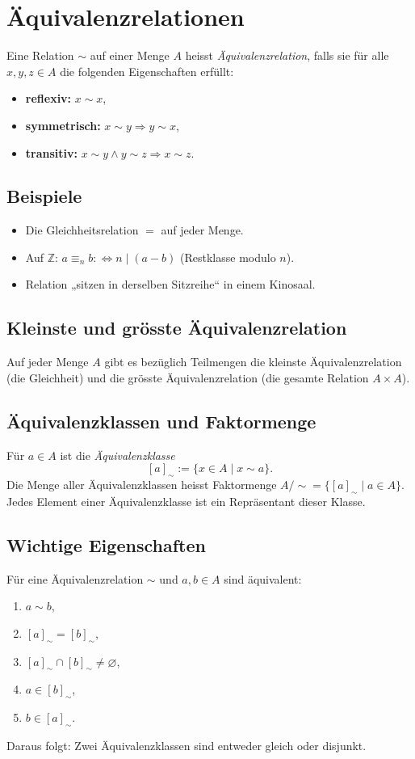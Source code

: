 \section{Äquivalenzrelationen}
Eine Relation $\sim$ auf einer Menge $A$ heisst \emph{Äquivalenzrelation}, falls sie für alle $x,y,z\in A$ die folgenden Eigenschaften erfüllt:
\begin{itemize}
  \item \textbf{reflexiv:} \quad $x\sim x$,
  \item \textbf{symmetrisch:} \quad $x\sim y \Rightarrow y\sim x$,
  \item \textbf{transitiv:} \quad $x\sim y \land y\sim z \Rightarrow x\sim z$.
\end{itemize}

\subsection{Beispiele}
\begin{itemize}
  \item Die Gleichheitsrelation $=$ auf jeder Menge.
  \item Auf $\mathbb{Z}$: $a\equiv_n b :\Leftrightarrow n\mid(a-b)$ (Restklasse modulo $n$).
  \item Relation „sitzen in derselben Sitzreihe“ in einem Kinosaal.
\end{itemize}

\subsection{Kleinste und gr\"osste Äquivalenzrelation}
Auf jeder Menge $A$ gibt es bezüglich Teilmengen die kleinste Äquivalenzrelation (die Gleichheit) und die grösste Äquivalenzrelation (die gesamte Relation $A\times A$).

\subsection{Äquivalenzklassen und Faktormenge}
Für $a\in A$ ist die \emph{Äquivalenzklasse}
\[
[a]_\sim := \{x\in A \mid x\sim a\}.
\]
Die Menge aller Äquivalenzklassen heisst Faktormenge $A/\sim = \{[a]_\sim \mid a\in A\}$.
Jedes Element einer Äquivalenzklasse ist ein Repräsentant dieser Klasse.

\subsection{Wichtige Eigenschaften}
Für eine Äquivalenzrelation $\sim$ und $a,b\in A$ sind äquivalent:
\begin{enumerate}
  \item $a\sim b$,
  \item $[a]_\sim = [b]_\sim$,
  \item $[a]_\sim \cap [b]_\sim \neq \varnothing$,
  \item $a\in [b]_\sim$,
  \item $b\in [a]_\sim$.
\end{enumerate}
Daraus folgt: Zwei Äquivalenzklassen sind entweder gleich oder disjunkt.

